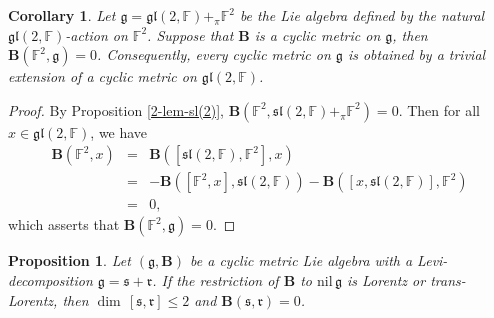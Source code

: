 \documentclass[reqno]{amsart}
\newtheorem{prop}[thm]{Proposition}
\newtheorem{cor}[thm]{Corollary}
\theoremstyle{definition}
\begin{document}
\begin{cor}
Let $\mathfrak{g}=\mathfrak{gl}(2,\mathbb{F})+_{\pi}\mathbb{F}^{2}$ be the  Lie algebra defined by the natural $\mathfrak{gl}(2,\mathbb{F})$-action on $\mathbb{F}^{2}$. Suppose that $\mathbf{B}$ is a cyclic metric on  $\mathfrak{g}$, then $\mathbf{B}(\mathbb{F}^{2},\mathfrak{g})=0$.
Consequently, every cyclic metric on $\mathfrak{g}$ is obtained by a trivial extension of a cyclic metric on
$\mathfrak{gl}(2,\mathbb{F})$.
\end{cor}
\begin{proof}
By Proposition \ref{2-lem-sl(2)},  $\mathbf{B}(\mathbb{F}^{2},\mathfrak{sl}(2,\mathbb{F})+_{\pi}\mathbb{F}^{2})=0$.
Then for all $x\in \mathfrak{gl}(2,\mathbb{F})$, we have
\begin{eqnarray*}
  \mathbf{B}(\mathbb{F}^{2},x) &=& \mathbf{B}([\mathfrak{sl}(2,\mathbb{F}),\mathbb{F}^{2}],x) \\
   &=& -\mathbf{B}([\mathbb{F}^{2},x],\mathfrak{sl}(2,\mathbb{F}))
   -\mathbf{B}([x,\mathfrak{sl}(2,\mathbb{F})],\mathbb{F}^{2})\\
   &=& 0,
\end{eqnarray*}
which asserts that $\mathbf{B}(\mathbb{F}^{2},\mathfrak{g})=0$.
\end{proof}
\begin{prop}\label{2-lem-tran-lorentz}
Let $(\mathfrak{g},\mathbf{B})$ be a cyclic metric Lie algebra
 with a Levi-decomposition $\mathfrak{g}=\mathfrak{s}+\mathfrak{r}$.
If the restriction of $\mathbf{B}$ to $\mathrm{nil}\,\mathfrak{g}$ is  Lorentz or trans-Lorentz,
 then $\dim\, [\mathfrak{s},\mathfrak{r}]\leq2$ and $\mathbf{B}(\mathfrak{s},\mathfrak{r})=0$.
\end{prop}
\end{document}
